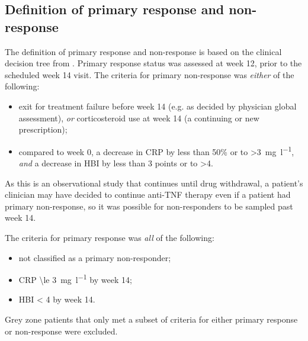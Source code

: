 \begin{outline}
\subsection{Definition of primary response and non-response}
\label{multiPANTS:PR_definition}

The definition of primary response and non-response is based on the clinical decision tree from \textcite{kennedy2019PredictorsAntiTNFTreatment}.
Primary response status was assessed at week 12, prior to the scheduled week 14 visit. 
The criteria for primary non-response was \emph{either} of the following: 
\begin{itemize}
    \item exit for treatment failure before week 14 (e.g. as decided by physician global assessment), \emph{or} corticosteroid use at week 14 (a continuing or new prescription);
    \item compared to week 0, a decrease in \gls{CRP} by less than 50\% or to >\SI{3}{\milli\gram\per\litre}, \emph{and} a decrease in \gls{HBI} by less than 3 points or to >4.
\end{itemize}
As this is an observational study that continues until drug withdrawal, a patient's clinician may have decided to continue anti-\gls{TNF} therapy even if a patient had primary non-response, so it was possible for non-responders to be sampled past week 14.

The criteria for primary response was \emph{all} of the following:
\begin{itemize}
    \item not classified as a primary non-responder;
    \item \gls{CRP} \SI{\le 3}{\milli\gram\per\litre} by week 14;
    \item \gls{HBI} < 4 by week 14.
\end{itemize}
Grey zone patients that only met a subset of criteria for either primary response or non-response were excluded.


\end{outline}
